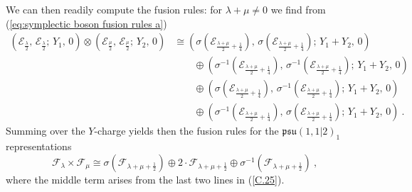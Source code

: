 \documentclass[12pt,a4paper]{article}
\newcommand{\be}{\begin{equation}}
\newcommand{\ee}{\end{equation}}
\begin{document}
We can then readily compute the fusion rules: for $\lambda+\mu \ne 0$ we find from (\ref{eq:symplectic boson fusion rules a})
\begin{align}
(\mathscr{E}_{\frac{\lambda}{2}},\, \mathscr{E}_{\frac{\lambda}{2}};\, Y_1,\, 0) \otimes (\mathscr{E}_{\frac{\mu}{2}},\, \mathscr{E}_{\frac{\mu}{2}};\, Y_2,\, 0) &\cong (\sigma(\mathscr{E}_{\frac{\lambda+\mu}{2}+\frac{1}{4}}),\, \sigma(\mathscr{E}_{\frac{\lambda+\mu}{2}+\frac{1}{4}});\, Y_1+Y_2,\, 0)\nonumber\\
&\qquad\!\! \oplus (\sigma^{-1}(\mathscr{E}_{\frac{\lambda+\mu}{2}+\frac{1}{4}}),\,\sigma^{-1}(\mathscr{E}_{\frac{\lambda+\mu}{2}+\frac{1}{4}});\, Y_1+Y_2,\, 0)\nonumber\\
&\qquad\!\!\oplus (\sigma(\mathscr{E}_{\frac{\lambda+\mu}{2}+\frac{1}{4}}),\,\sigma^{-1}(\mathscr{E}_{\frac{\lambda+\mu}{2}+\frac{1}{4}});\, Y_1+Y_2,\, 0)\nonumber\\
&\qquad\!\!\oplus (\sigma^{-1}(\mathscr{E}_{\frac{\lambda+\mu}{2}+\frac{1}{4}}),\,\sigma(\mathscr{E}_{\frac{\lambda+\mu}{2}+\frac{1}{4}});\, Y_1+Y_2,\, 0)\ . \label{C.25}
\end{align}
Summing over the $Y$-charge yields then the fusion rules for the $\mathfrak{psu}(1,1|2)_1$ representations
\be 
\mathscr{F}_\lambda \times \mathscr{F}_\mu \cong \sigma(\mathscr{F}_{\lambda+\mu+\frac{1}{2}})\oplus 2\cdot \mathscr{F}_{\lambda+\mu+\frac{1}{2}} \oplus\sigma^{-1}(\mathscr{F}_{\lambda+\mu+\frac{1}{2}})\ ,
\ee
where the middle term arises from the last two lines in (\ref{C.25}).
\smallskip
\end{document}
